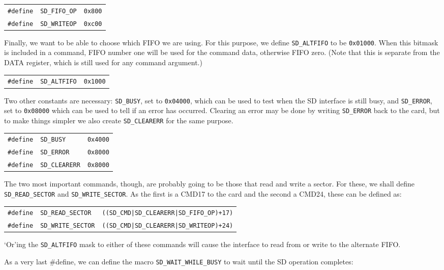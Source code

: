 \documentclass{gqtekspec}
\begin{document}
\begin{tabular}{lll}
{\tt \#define} & {\tt SD\_FIFO\_OP} & {\tt 0x800} \\
{\tt \#define} & {\tt SD\_WRITEOP}  & {\tt 0xc00}
\end{tabular}

Finally, we want to be able to choose which FIFO we are using.  For this
purpose, we define {\tt SD\_ALTFIFO} to be {\tt 0x01000}.  When this bitmask
is included in a command, FIFO number one will be used for the command data,
otherwise FIFO zero.  (Note that this is separate from the DATA register,
which is still used for any command argument.)

\begin{tabular}{lll}
{\tt \#define} & {\tt SD\_ALTFIFO} & {\tt 0x1000}
\end{tabular}

Two other constants are necessary: {\tt SD\_BUSY}, set to {\tt 0x04000}, which
can be used to test when the SD interface is still busy, and {\tt SD\_ERROR},
set to {\tt 0x08000} which can be used to tell if an error has occurred.
Clearing an error may be done by writing {\tt SD\_ERROR} back to the card, but
to make things simpler we also create {\tt SD\_CLEARERR} for the same purpose.

\begin{tabular}{lll}
{\tt \#define} & {\tt SD\_BUSY} & {\tt 0x4000} \\
{\tt \#define} & {\tt SD\_ERROR} & {\tt 0x8000} \\
{\tt \#define} & {\tt SD\_CLEARERR} & {\tt 0x8000}
\end{tabular}

The two most important commands, though, are probably going to be those that
read and write a sector.  For these, we shall define {\tt SD\_READ\_SECTOR}
and {\tt SD\_WRITE\_SECTOR}.  As the first is a CMD17 to the card and the second
a CMD24, these can be defined as:

\begin{tabular}{lll}
{\tt \#define} & {\tt SD\_READ\_SECTOR} & {\tt ((SD\_CMD|SD\_CLEARERR|SD\_FIFO\_OP)+17)} \\
{\tt \#define} & {\tt SD\_WRITE\_SECTOR} & {\tt ((SD\_CMD|SD\_CLEARERR|SD\_WRITEOP)+24)}
\end{tabular}

`Or'ing the {\tt SD\_ALTFIFO} mask to either of these commands will cause the
interface to read from or write to the alternate FIFO.

As a very last \#define, we can define the macro {\tt SD\_WAIT\_WHILE\_BUSY}
to wait until the SD operation completes:
\end{document}
